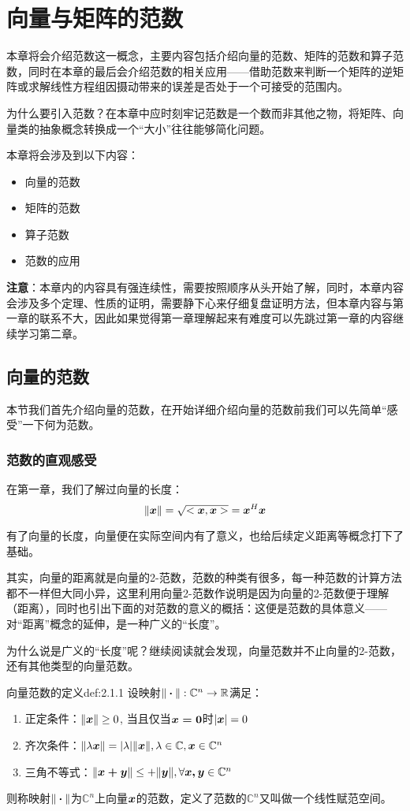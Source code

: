 \documentclass[12pt, a4paper, oneside, UTF8]{ctexbook}
\begin{document}
\else
\fi
\chapter{向量与矩阵的范数}
本章将会介绍范数这一概念，主要内容包括介绍向量的范数、矩阵的范数和算子范数，同时在本章的最后会介绍范数的相关应用——借助范数来判断一个矩阵的逆矩阵或求解线性方程组因摄动带来的误差是否处于一个可接受的范围内。

为什么要引入范数？在本章中应时刻牢记范数是一个数而非其他之物，将矩阵、向量类的抽象概念转换成一个“大小”往往能够简化问题。

本章将会涉及到以下内容：
\begin{itemize}[leftmargin=4em]
    \item 向量的范数
    \item 矩阵的范数
    \item 算子范数
    \item 范数的应用
\end{itemize}
\noindent

\textbf{注意}：本章内的内容具有强连续性，需要按照顺序从头开始了解，同时，本章内容会涉及多个定理、性质的证明，需要静下心来仔细复盘证明方法，但本章内容与第一章的联系不大，因此如果觉得第一章理解起来有难度可以先跳过第一章的内容继续学习第二章。
\newpage
\section{向量的范数}
本节我们首先介绍向量的范数，在开始详细介绍向量的范数前我们可以先简单“感受”一下何为范数。
\subsection{范数的直观感受}
在第一章，我们了解过向量的长度：
\[\Vert \boldsymbol{x}\Vert=\sqrt{<\boldsymbol{x},\boldsymbol{x}>}=\boldsymbol{x}^H\boldsymbol{x}\]

有了向量的长度，向量便在实际空间内有了意义，也给后续定义距离等概念打下了基础。

其实，向量的距离就是向量的2-范数，范数的种类有很多，每一种范数的计算方法都不一样但大同小异，这里利用向量2-范数作说明是因为向量的2-范数便于理解（距离），同时也引出下面的对范数的意义的概括：这便是范数的具体意义——对“距离”概念的延伸，是一种广义的“长度”。

为什么说是广义的“长度”呢？继续阅读就会发现，向量范数并不止向量的2-范数，还有其他类型的向量范数。

\begin{defn}{向量范数的定义}{def:2.1.1}
    设映射$\Vert \boldsymbol{\cdot}\Vert: \mathbb{C} ^n\rightarrow \mathbb{R} $满足：
    \begin{enumerate}
        \item 正定条件：$\Vert \boldsymbol{x}\Vert\geq0$, 当且仅当$\boldsymbol{x=0}$时$|\boldsymbol{x}|=0$
        \item 齐次条件：$\Vert \lambda\boldsymbol{x}\Vert=|\lambda|\Vert\boldsymbol{x}\Vert,\lambda\in\mathbb{C} ,\boldsymbol{x}\in\mathbb{C}^n$
        \item 三角不等式：$\Vert\boldsymbol{x+y}\Vert\leq+\Vert\boldsymbol{y}\Vert,\forall \boldsymbol{x,y}\in\mathbb{C}^n$
    \end{enumerate}
    则称映射$\Vert\boldsymbol{\cdot}\Vert$为$\mathbb{C}^n$上向量$\boldsymbol{x}$的范数，定义了范数的$\mathbb{C}^n$又叫做一个线性赋范空间。
\end{defn}
\end{document}
